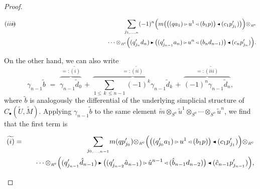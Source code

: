 \documentclass[reqno, a4paper, 10pt]{amsart}
\numberwithin{equation}{section}
\theoremstyle{plain}
\theoremstyle{definition}
\theoremstyle{remark}
\begin{document}
\begin{proof}
\begin{footnotesize}
\begin{eqnarray*}
(iii) &\!\!\!\!\!\!=&\!\!\!\!\!\!
  \sum_{j_{1, \ldots,n}} (-1)^n \Big( m{\big( {{\big( {(qa_1){{\,\raise1pt\hbox{$\scriptscriptstyle{\rhd}$} \, }} u^1{{\,\raise1pt\hbox{$\scriptscriptstyle{\lhd}$} \, }}(b_1p)} \big)}{{\,\raise1pt\hbox{$\scriptscriptstyle{\blacktriangleleft}$} \, }} (c_1p_{j_1}') } \big)}\Big){\otimes_{\scriptscriptstyle{{\scriptscriptstyle{{R^{\rm e}}}}}}} 
  \\
&& \qquad \qquad \qquad \qquad \qquad \qquad \qquad 
\cdots {\otimes_{\scriptscriptstyle{{\scriptscriptstyle{{R^{\rm e}}}}}}} \Big((q_{j_n}'d_n) {{\,\raise1pt\hbox{$\scriptscriptstyle{\blacktriangleright}$} \, }} {\big( {(q_{j_{n-1}}'a_n){{\,\raise1pt\hbox{$\scriptscriptstyle{\rhd}$} \, }} u^{n}{{\,\raise1pt\hbox{$\scriptscriptstyle{\lhd}$} \, }}(b_nd_{n-1})} \big)}{{\,\raise1pt\hbox{$\scriptscriptstyle{\blacktriangleleft}$} \, }} (c_np_{j_n}')\Big). 
\end{eqnarray*}
\end{footnotesize}
On the other hand, we can also write  
$$ 
\gamma_{n-1}{\tilde{{b}}}\,\,=\,\, \overset{=:\widetilde{(i)}}{\overbrace{\gamma_{n-1} {\tilde{{d}}}_0}} \,+\, \overset{=:\widetilde{(ii)}}{\overbrace{\sum_{1\leq \, k\,  \leq n-1} (-1)^k  \gamma_{n-1}{\tilde{{d}}}_k}} \,+\, \overset{=:\widetilde{(iii)}}{\overbrace{(-1)^n \gamma_{n-1}{\tilde{{d}}}_n}},
$$
where ${\tilde{{b}}}$ is analogously the differential of the underlying simplicial structure of $C_{{\scriptscriptstyle{\bullet}}}({\tilde{{U}}}, {\tilde{{M}}})$.
Applying $\gamma_{n-1} {\tilde{{b}}}$ to the same element ${\tilde{{m}}}{\otimes_{\scriptscriptstyle{{S^{{{o}}}}}}}{\tilde{{u}}}^1{\otimes_{\scriptscriptstyle{{S^{{{o}}}}}}}\cdots{\otimes_{\scriptscriptstyle{{\scriptscriptstyle{{S^{o}}}}}}}{\tilde{{u}}}^n$, 
we find that the first term is
\begin{footnotesize}
\begin{eqnarray*}
\widetilde{(i)} &=& \underset{j_{0, \ldots,{n-1}}}{\sum}  m(qp_{j_0}') {\otimes_{\scriptscriptstyle{{\scriptscriptstyle{{R^{\rm e}}}}}}}\Big( {\big( {(q_{j_0}'a_1){{\,\raise1pt\hbox{$\scriptscriptstyle{\rhd}$} \, }} u^1{{\,\raise1pt\hbox{$\scriptscriptstyle{\lhd}$} \, }}(b_1p)} \big)}{{\,\raise1pt\hbox{$\scriptscriptstyle{\blacktriangleleft}$} \, }} (c_1p_{j_1}')\Big) {\otimes_{\scriptscriptstyle{{\scriptscriptstyle{{R^{\rm e}}}}}}}\\
&& \quad \cdots {\otimes_{\scriptscriptstyle{{\scriptscriptstyle{{R^{\rm e}}}}}}} \Big(  (q_{j_{n-1}}'\hat{d}_{n-1}){{\,\raise1pt\hbox{$\scriptscriptstyle{\blacktriangleright}$} \, }} {\big( { (q_{j_{n-2}}'\hat{a}_{n-1}){{\,\raise1pt\hbox{$\scriptscriptstyle{\rhd}$} \, }} \hat{u}^{n-1}{{\,\raise1pt\hbox{$\scriptscriptstyle{\lhd}$} \, }}(\hat{b}_{n-1}d_{n-2}) } \big)} {{\,\raise1pt\hbox{$\scriptscriptstyle{\blacktriangleleft}$} \, }}(\hat{c}_{n-1}p_{j_{n-1}}') \Big),

\end{eqnarray*}
\end{footnotesize}
\end{proof}
\end{document}
